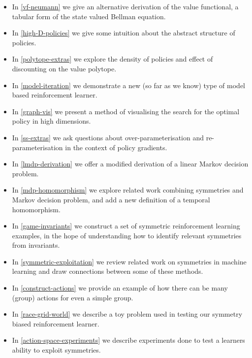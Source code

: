 \documentclass[12pt, a4paper, twoside, openright]{book}
\providecommand{\tightlist}{%
  \setlength{\itemsep}{0pt}\setlength{\parskip}{0pt}}
\begin{document}
\begin{itemize}
\tightlist
\item In \ref{vf-neumann} we give an alternative derivation of the value functional, a tabular form of the state valued Bellman equation.
\item In \ref{high-D-policies} we give some intuition about the abstract structure of policies.
\item In \ref{polytope-extras} we explore the density of policies and effect of discounting on the value polytope.
\item In \ref{model-iteration} we demonstrate a new (so far as we know) type of model based reinforcement learner.
\item In \ref{graph-vis} we present a method of visualising the search for the optimal policy in high dimensions.
\item In \ref{ss-extras} we ask questions about over-parameterisation and re-parameterisation in the context of policy gradients.
\item In \ref{lmdp-derivation} we offer a modified derivation of a linear Markov decision problem.
\item In \ref{mdp-homomorphism} we explore related work combining symmetries and Markov decision problem, and add a new definition of a temporal homomorphism.
\item In \ref{game-invariants} we construct a set of symmetric reinforcement learning examples, in the hope of understanding how to identify relevant symmetries from invariants.
\item In \ref{symmetric-exploitation} we review related work on symmetries in machine learning and draw connections between some of these methods.
\item In \ref{construct-actions} we provide an example of how there can be many (group) actions for even a simple group.
\item In \ref{race-grid-world} we describe a toy problem used in testing our symmetry biased reinforcement learner.
\item In \ref{action-space-experiments} we describe experiments done to test a learners ability to exploit symmetries.
\end{itemize}



\end{document}
